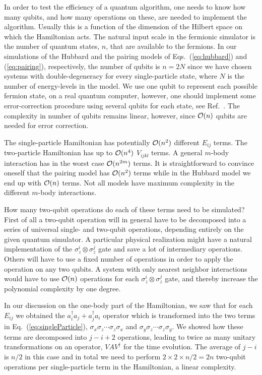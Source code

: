In order to test the efficiency of a quantum algorithm, one needs to know how many
qubits, and how many operations on these, are  needed to implement the
algorithm.  Usually this is a 
function of the dimension of the Hilbert space on which the
Hamiltonian acts. The natural input scale 
in the fermionic simulator is the number of quantum states, $n$, that are
available to the fermions.
In our simulations  of the Hubbard and the pairing
models of Eqs.~(\ref{eq:hubbard}) and (\ref{eq:pairing}), respectively, 
the number of qubits is $n=2N$ since we have chosen systems with 
double-degeneracy for every single-particle state, where $N$ is the
number of energy-levels in the model.
We use one qubit to represent each possible fermion state,
on a real quantum computer, however, one should implement some
error-correction procedure using several qubits for each state, see
Ref.~\cite{nielsen2000}. 
The complexity in number of qubits remains linear, however, since ${\cal O} (n)$
qubits are needed for error correction.

The single-particle Hamiltonian has  potentially ${\cal O} (n^2)$
different $E_{ij}$ terms. The two-particle Hamiltonian has up to
${\cal O} (n^4)$ $V_{ijkl}$ terms. A general $m$-body interaction has
in the worst case  ${\cal O} (n^{2m})$ terms. It is straightforward to
convince oneself that the
pairing model has  ${\cal O} (n^2)$ terms  while
in the Hubbard model we end up with   ${\cal O}
(n)$ terms. Not all models have maximum complexity in the different
$m$-body interactions.

How many two-qubit operations do each of these terms need to be
simulated? First of all a two-qubit operation will in general have to
be decomposed into a series of universal single- and two-qubit
operations, depending entirely on the given quantum simulator. A particular
physical realization might have a natural implementation of the
$\sigma_z^i\otimes \sigma_z^j$ gate and save a lot of intermediary
operations.
Others will have to use a fixed number of operations in order to apply  the
operation on any two qubits. A system with only nearest neighbor
interactions would have to use ${\cal O}(n)$ operations for each
$\sigma_z^i\otimes \sigma_z^j$ gate, and thereby increase the
polynomial complexity by one degree. 

In our discussion on the one-body part of the Hamiltonian, 
we saw that for each $E_{ij}$ we obtained the
$a^\dag_ia_j + a^\dag_j a_i$ operator which is transformed into the
two terms in Eq.~(\ref{eq:singleParticle}), 
$\sigma_x\sigma_z\cdots\sigma_z \sigma_x$ and 
$\sigma_y\sigma_z\cdots\sigma_z \sigma_y$. 
We  showed how these terms are
decomposed into $j-i+2$ operations, leading to twice as many 
unitary transformations on an operator, $VAV^\dag$ for the time evolution.
The average of $j-i$ is $n/2$ in this case and in total we need to
perform $2\times 2\times n/2 = 2n$ two-qubit operations per
single-particle term in the Hamiltonian, a linear complexity.

